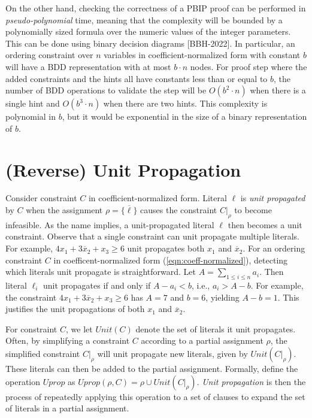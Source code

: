 \documentclass{easychair}
\renewcommand{\obar}[1]{\overline{#1}}
\newcommand{\lit}{\ell}
\newcommand{\assign}{\rho}
\newcommand{\simplify}[2]{#1|_{#2}}
\newcommand{\unit}{\mathit{Unit}}
\newcommand{\uprop}{\mathit{Uprop}}
\begin{document}
On the other hand, checking the correctness of a PBIP proof can be
performed in {\em pseudo-polynomial} time, meaning that the complexity will
be bounded by a polynomially sized formula over the numeric values of
the integer parameters.  This can be done using binary decision
diagrams [BBH-2022].  In particular, an ordering constraint over $n$ variables in
coefficient-normalized form with constant $b$ will have a BDD
representation with at most $b \cdot n$ nodes.  For proof step where
the added constraints and the hints all have constants less than or equal
to $b$, the number of BDD operations to validate the step will be
$O(b^{2} \cdot n)$ when there is a single hint and $O(b^{3} \cdot n)$
when there are two hints.  This complexity is polynomial in $b$, but
it would be exponential in the size of a binary representation of $b$.

\section{(Reverse) Unit Propagation}

Consider constraint $C$ in coefficient-normalized form.  Literal
$\lit$ is {\em unit propagated} by $C$ when the assignment $\assign =
\{ \obar{\lit} \}$ causes the constraint $\simplify{C}{\assign}$ to become
infeasible.  As the name implies, a unit-propagated literal $\lit$ then becomes a unit constraint.
Observe that a single constraint can unit propagate
multiple literals.  For example, $4 x_1 + 3 \obar{x}_2 + x_3 \geq 6$
unit propagates both $x_1$ and $\obar{x}_2$.
For an ordering constraint $C$ in coefficent-normalized form
(\ref{eqn:coeff-normalized}), detecting which literals unit propagate
is straightforward.  Let $A = \sum_{1 \leq i \leq n} a_{i}$.  Then
literal $\lit_{i}$ unit propagates if and only if $A - a_{i} < b$,
i.e., $a_{i} > A - b$.  For example, the constraint $4 x_1 + 3
\obar{x}_2 + x_3 \geq 6$ has $A = 7$ and $b=6$, yielding $A-b=1$.
This justifies the unit propagations of both $x_1$ and $\obar{x}_2$.

For constraint $C$, we let $\unit(C)$ denote the set of literals it
unit propagates.  Often, by simplifying a constraint $C$ according to
a partial assignment $\assign$, the simplified constraint $\simplify{C}{\assign}$
will unit propagate new literals, given by $\unit(\simplify{C}{\assign})$.  These
literals can then be added to the partial assignment.  Formally,
define the operation $\uprop$ as  $\uprop(\assign, C) = \assign \cup \unit(\simplify{C}{\assign})$.
{\em Unit propagation} is then the process of
repeatedly applying this operation to a set of clauses to expand the
set of literals in a partial assignment.
\end{document}
